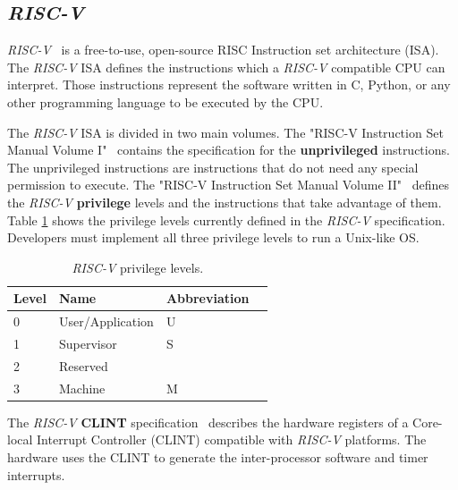 \subsection{\textit{RISC-V}}

\textit{RISC-V}~\cite{asanovic2014instruction} is a free-to-use, open-source RISC Instruction set architecture (ISA). The \textit{RISC-V} ISA defines the instructions which a \textit{RISC-V} compatible CPU can interpret. Those instructions represent the software written in C, Python, or any other programming language to be executed by the CPU.

The \textit{RISC-V} ISA is divided in two main volumes. The "RISC-V Instruction Set Manual Volume I"~\cite{riscv_unprivilege} contains the specification for the \textbf{unprivileged} instructions. The unprivileged instructions are instructions that do not need any special permission to execute. The "RISC-V Instruction Set Manual Volume II"~\cite{riscv_privilege} defines the \textit{RISC-V} \textbf{privilege} levels and the instructions that take advantage of them. Table \ref{tab:riscv_privilege_levels} shows the privilege levels currently defined in the \textit{RISC-V} specification. Developers must implement all three privilege levels to run a Unix-like OS.

\begin{table}[!ht]
  \centering
  \begin{tabular}{|l|l|l|l|}
  \hline
  \textbf{Level} & \textbf{Name}    & \textbf{Abbreviation} \\ \hline
  0              & User/Application & U                     \\ \hline
  1              & Supervisor       & S                     \\ \hline
  2              & Reserved         &                       \\ \hline
  3              & Machine          & M                     \\ \hline
  \end{tabular}
  \caption{\textit{RISC-V} privilege levels.}
  \label{tab:riscv_privilege_levels}
\end{table}

The \textit{RISC-V} \textbf{CLINT} specification~\cite{clint_riscv_spec} describes the hardware registers of a Core-local Interrupt Controller (CLINT) compatible with \textit{RISC-V} platforms. The hardware uses the CLINT to generate the inter-processor software and timer interrupts.

